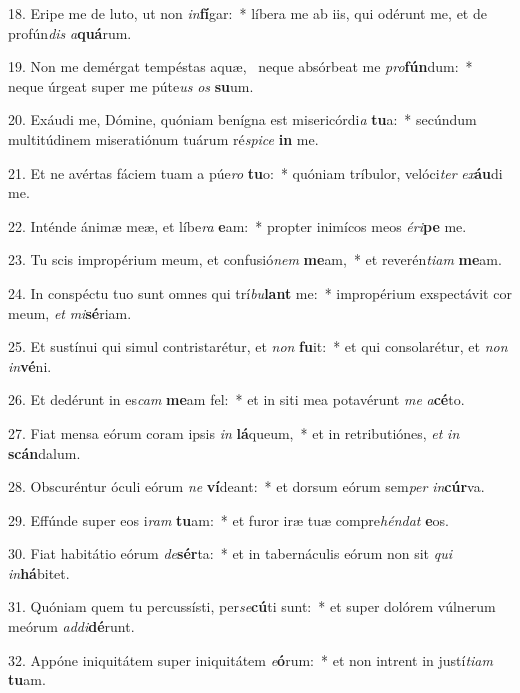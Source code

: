 18. Eripe me de luto, ut non \textit{in}\textbf{fí}gar:~*  líbera me ab iis, qui odérunt me, et de profún\textit{dis} \textit{a}\textbf{quá}rum.\

19. Non me demérgat tempéstas aquæ, \dag\  neque absórbeat me \textit{pro}\textbf{fún}dum:~*  neque úrgeat super me púte\textit{us} \textit{os} \textbf{su}um.\

20. Exáudi me, Dómine, quóniam benígna est misericórdi\textit{a} \textbf{tu}a:~*  secúndum multitúdinem miseratiónum tuárum ré\textit{spi}\textit{ce} \textbf{in} me.\

21. Et ne avértas fáciem tuam a púe\textit{ro} \textbf{tu}o:~*  quóniam tríbulor, velóci\textit{ter} \textit{ex}\textbf{áu}di me.\

22. Inténde ánimæ meæ, et líbe\textit{ra} \textbf{e}am:~*  propter inimícos meos \textit{é}\textit{ri}\textbf{pe} me.\

23. Tu scis impropérium meum, et confusió\textit{nem} \textbf{me}am,~*  et reverén\textit{ti}\textit{am} \textbf{me}am.\

24. In conspéctu tuo sunt omnes qui trí\textit{bu}\textbf{lant} me:~*  impropérium exspectávit cor meum, \textit{et} \textit{mi}\textbf{sé}riam.\

25. Et sustínui qui simul contristarétur, et \textit{non} \textbf{fu}it:~*  et qui consolarétur, et \textit{non} \textit{in}\textbf{vé}ni.\

26. Et dedérunt in es\textit{cam} \textbf{me}am fel:~*  et in siti mea potavérunt \textit{me} \textit{a}\textbf{cé}to.\

27. Fiat mensa eórum coram ipsis \textit{in} \textbf{lá}queum,~*  et in retributiónes, \textit{et} \textit{in} \textbf{scán}dalum.\

28. Obscuréntur óculi eórum \textit{ne} \textbf{ví}deant:~*  et dorsum eórum sem\textit{per} \textit{in}\textbf{cúr}va.\

29. Effúnde super eos i\textit{ram} \textbf{tu}am:~*  et furor iræ tuæ compre\textit{hén}\textit{dat} \textbf{e}os.\

30. Fiat habitátio eórum \textit{de}\textbf{sér}ta:~*  et in tabernáculis eórum non sit \textit{qui} \textit{in}\textbf{há}bitet.\

31. Quóniam quem tu percussísti, per\textit{se}\textbf{cú}ti sunt:~*  et super dolórem vúlnerum meórum \textit{ad}\textit{di}\textbf{dé}runt.\

32. Appóne iniquitátem super iniquitátem \textit{e}\textbf{ó}rum:~*  et non intrent in justí\textit{ti}\textit{am} \textbf{tu}am.\

